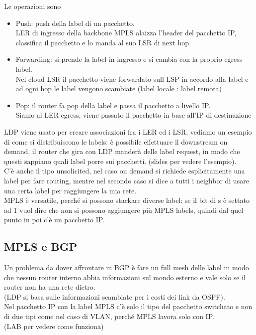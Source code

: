 \documentclass[12pt, oneside]{extbook} %
\begin{document}
Le operazioni sono
\begin{itemize}
    \item Push: push della label di un pacchetto.
    \\LER di ingresso della backbone MPLS alaizza l'header del pacchetto IP, classifica il pacchetto e lo manda al suo LSR di next hop
    \item Forwarding: si prende la label in ingresso e si cambia con la proprio egress label.
    \\Nel cloud LSR il pacchetto viene forwardato sull LSP in accordo alla label e ad ogni hop le label vengono scambiate (label locale : label remota)
    \item Pop: il router fa pop della label e passa il pacchetto a livello IP.
    \\Siamo al LER egress, viene passato il pacchetto in base all'IP di destinazione
\end{itemize}
LDP viene usato per creare associazioni fra i LER ed i LSR, vediamo un esempio di come si distribuiscono le labels: è possibile effettuare il downstream on demand, il router che gira con LDP manderà delle label request, in modo che questi sappiano quali label porre sui pacchetti. (slides per vedere l'esempio).
\\C'è anche il tipo unsolicited, nel caso on demand si richiede esplicitamente una label per fare routing, mentre nel secondo caso si dice a tutti i neighbor di usare una certa label per raggiungere la mia rete.
\\MPLS è versatile, perché si possono stackare diverse label: se il bit di s è settato ad 1 vuol dire che non si possono aggiungere più MPLS labels, quindi dal quel punto in poi c'è un pacchetto IP.

\subsection{MPLS e BGP}
Un problema da dover affrontare in BGP è fare un full mesh delle label in modo che nessun router interno abbia informazioni sul mondo esterno e vale solo se il router non ha una rete dietro.
\\(LDP si basa sulle informazioni scambiate per i costi dei link da OSPF).
\\Nel pacchetto IP con la label MPLS c'è solo il tipo del pacchetto switchato e non di due tipi come nel caso di VLAN, perché MPLS lavora solo con IP.
\\(LAB per vedere come funziona)
\end{document}
